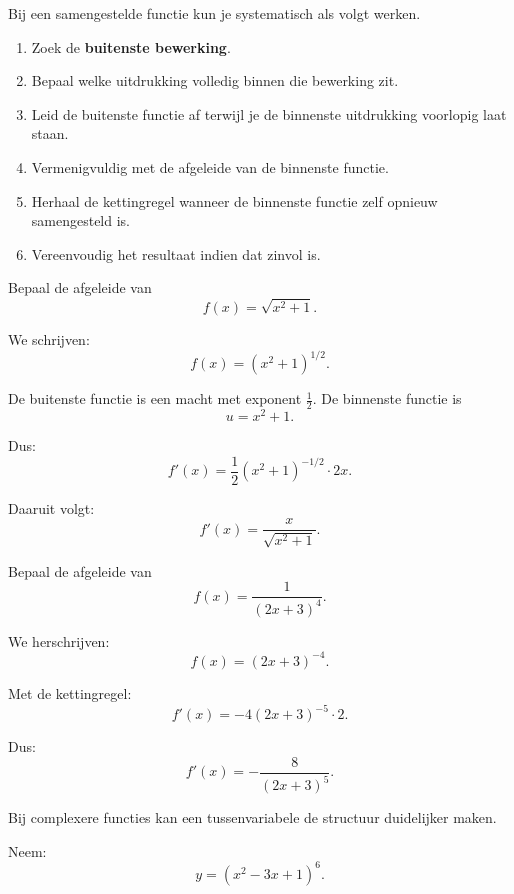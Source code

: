 \documentclass{ximera}
\begin{document}

Bij een samengestelde functie kun je systematisch als volgt werken.

\begin{enumerate}
  \item Zoek de \textbf{buitenste bewerking}.
  \item Bepaal welke uitdrukking volledig binnen die bewerking zit.
  \item Leid de buitenste functie af terwijl je de binnenste uitdrukking
        voorlopig laat staan.
  \item Vermenigvuldig met de afgeleide van de binnenste functie.
  \item Herhaal de kettingregel wanneer de binnenste functie zelf opnieuw
        samengesteld is.
  \item Vereenvoudig het resultaat indien dat zinvol is.
\end{enumerate}


\begin{voorbeeld}[Wortelfunctie]
Bepaal de afgeleide van
\[f(x)=\sqrt{x^2+1}.\]

We schrijven:
\[f(x)=(x^2+1)^{1/2}.\]

De buitenste functie is een macht met exponent $\frac12$.
De binnenste functie is
\[u=x^2+1.\]

Dus:
\[
f'(x)
=
\frac12(x^2+1)^{-1/2}\cdot2x.
\]

Daaruit volgt:
\[\boxed{f'(x)=\frac{x}{\sqrt{x^2+1}}.}\]
\end{voorbeeld}


\begin{voorbeeld}
Bepaal de afgeleide van
\[f(x)=\frac{1}{(2x+3)^4}.\]

We herschrijven:
\[f(x)=(2x+3)^{-4}.\]

Met de kettingregel:
\[
f'(x)
=
-4(2x+3)^{-5}\cdot2.
\]

Dus:
\[\boxed{f'(x)=-\frac{8}{(2x+3)^5}.}\]
\end{voorbeeld}




Bij complexere functies kan een tussenvariabele de structuur duidelijker
maken.

Neem:
\[y=(x^2-3x+1)^6.\]
\end{document}
